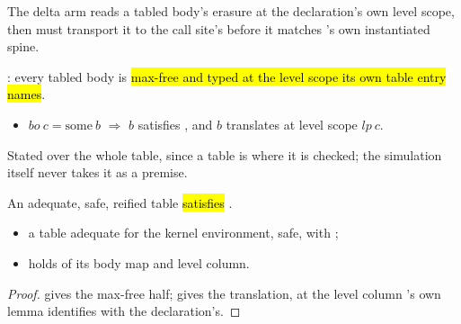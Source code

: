 The delta arm reads a tabled body's erasure at the declaration's own level scope, then must transport it
to the call site's before it matches 's own instantiated spine.

\begin{definition}
\label{def:TabledLevels}
\leanok
{}
 : every tabled body is \hl{max-free and typed at the level scope its
own table entry names}.
\begin{itemize}
\item $bo\ c = \mathrm{some}\ b$ $\Rightarrow$ $b$ satisfies , and $b$ translates at
level scope $lp\ c$.
\end{itemize}
 Stated over the whole table, since a table is where it is checked; the simulation itself
never takes it as a premise.
\end{definition}

\begin{lemma}
\label{lem:tabledLevels_of_table}
\leanok
{}
 An adequate, safe, reified table \hl{satisfies }.
\begin{itemize}
\item {} a table adequate for the kernel environment, safe, with ;
\item {}  holds of its body map and level column.
\end{itemize}
\end{lemma}
\begin{proof}
\leanok
{}
  gives the max-free half;  gives the
translation, at the level column 's own lemma identifies with the
declaration's.
\end{proof}

